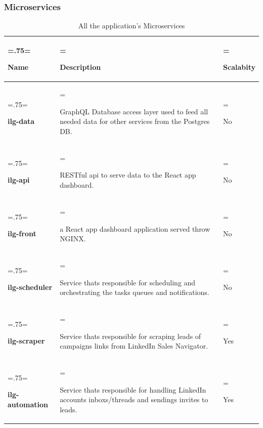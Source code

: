 \subsubsection{Microservices}
\begin{table}[H]
	\renewcommand{\arraystretch}{1.5}%
	\caption{All the application's Microservices}
	\centering
	\medskip
	\begin{tabularx}{1\textwidth} {
					| >{\hsize=.75\hsize\linewidth=\hsize\raggedright\arraybackslash}X
					| >{\hsize=1.8\hsize\linewidth=\hsize\raggedright\arraybackslash}X
					| >{\hsize=0.45\hsize\linewidth=\hsize\raggedright\arraybackslash}X |}
			\hline
			\rowcolor{primary} \textbf {Name} & \textbf {Description}                                                                                                                                                                                                                    & \textbf {Scalabity}                                                                                                                                                            \\
	  	\hline
			\textbf {ilg-data}                & GraphQL Database access layer used to feed all needed data for other services from the Postgres DB.  & No \\
			\hline
			\textbf {ilg-api}               & RESTful api to serve data to the React app dashboard.         & No \\
			\hline
			\textbf {ilg-front}                & a React app dashboard application served throw NGINX.       & No \\
			\hline
			\textbf {ilg-scheduler}                & Service thats responsible for scheduling and orchestrating the tasks queues and notifications.    & No \\
			\hline
			\textbf {ilg-scraper}                & Service thats responsible for scraping leads of campaigns links from LinkedIn Sales Navigator.             & Yes \\
			\hline
			\textbf {ilg-automation}                & Service thats responsible for handling LinkedIn accounts inboxs/threads and sendings invites to leads.                                                                                          & Yes \\
			\hline
	\end{tabularx}
\end{table}
\newpage
